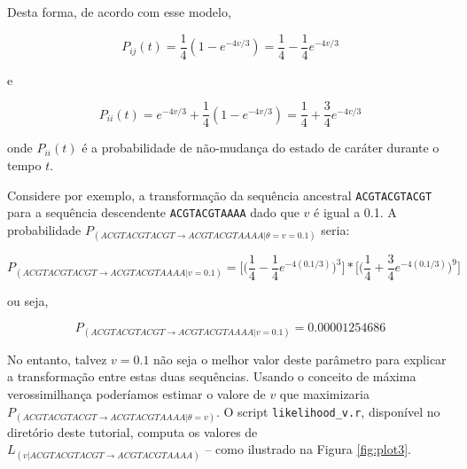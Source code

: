 \begin{refsection}
 Desta forma, de acordo com esse modelo,

\begin{center}
\begin{equation}
P_{ij}(t) = \frac{1}{4}(1-e^{-4v/3}) = \frac{1}{4}-\frac{1}{4}e^{-4v/3}
\end{equation}
\end{center}

e

\begin{center}
\begin{equation}
P_{ii}(t) =  e^{-4v/3}+\frac{1}{4}(1-e^{-4v/3}) = \frac{1}{4}+\frac{3}{4}e^{-4v/3}
\end{equation}
\end{center}


onde $P_{ii}(t)$ é a probabilidade de não-mudança do estado de caráter durante o tempo $t$.


Considere por exemplo, a transformação da sequência ancestral \texttt{ACGTACGTACGT} para a sequência descendente \texttt{ACGTACGTAAAA} dado que $v$ é igual a 0.1. A probabilidade $P_{(ACGTACGTACGT \rightarrow ACGTACGTAAAA|\theta = v = 0.1)}$ seria:

\begin{center}
\begin{equation}
P_{(ACGTACGTACGT \rightarrow ACGTACGTAAAA|v = 0.1)} =  \bigg[\Big(\frac{1}{4}-\frac{1}{4}e^{-4(0.1/3)}\Big)^3\bigg]*\bigg[\Big(\frac{1}{4}+\frac{3}{4}e^{-4(0.1/3)}\Big)^9\bigg]
\end{equation}
\end{center}

ou seja,


\begin{center}
\begin{equation}
P_{(ACGTACGTACGT \rightarrow ACGTACGTAAAA|v = 0.1)} =  0.00001254686
\end{equation}
\end{center}

No entanto, talvez $v=0.1$ não seja o melhor valor deste parâmetro para explicar a transformação entre estas duas sequências. Usando o conceito de máxima verossimilhança poderíamos estimar o valore de $v$ que maximizaria $P_{(ACGTACGTACGT \rightarrow ACGTACGTAAAA|\theta = v)}$. O script \texttt{likelihood\_v.r}, disponível no diretório deste tutorial, computa os valores de $L_{(v|ACGTACGTACGT \rightarrow ACGTACGTAAAA)}$ -- como ilustrado na Figura \ref{fig:plot3}.


\end{refsection}
